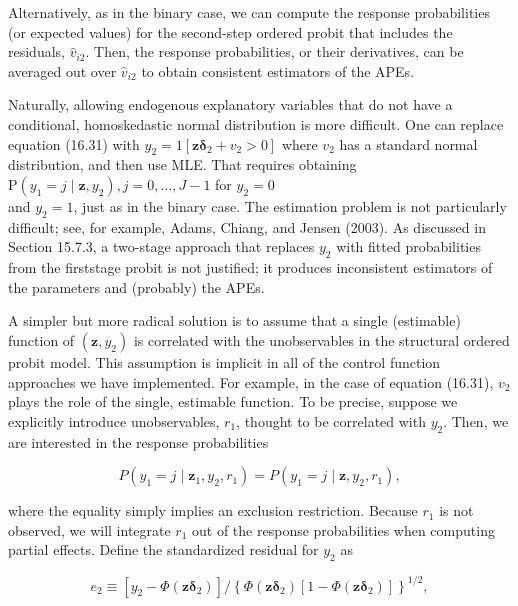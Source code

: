 \documentclass[10pt]{article}
\begin{document}
Alternatively, as in the binary case, we can compute the response probabilities (or expected values) for the second-step ordered probit that includes the residuals, $\hat{v}_{i 2}$. Then, the response probabilities, or their derivatives, can be averaged out over $\hat{v}_{i 2}$ to obtain consistent estimators of the APEs.

Naturally, allowing endogenous explanatory variables that do not have a conditional, homoskedastic normal distribution is more difficult. One can replace equation (16.31) with $y_{2}=1\left[\mathbf{z} \boldsymbol{\delta}_{2}+v_{2}>0\right]$ where $v_{2}$ has a standard normal distribution, and then use MLE. That requires obtaining $\mathrm{P}\left(y_{1}=j \mid \mathbf{z}, y_{2}\right), j=0, \ldots, J-1$ for $y_{2}=0$\\
and $y_{2}=1$, just as in the binary case. The estimation problem is not particularly difficult; see, for example, Adams, Chiang, and Jensen (2003). As discussed in Section 15.7.3, a two-stage approach that replaces $y_{2}$ with fitted probabilities from the firststage probit is not justified; it produces inconsistent estimators of the parameters and (probably) the APEs.

A simpler but more radical solution is to assume that a single (estimable) function of $\left(\mathbf{z}, y_{2}\right)$ is correlated with the unobservables in the structural ordered probit model. This assumption is implicit in all of the control function approaches we have implemented. For example, in the case of equation (16.31), $v_{2}$ plays the role of the single, estimable function. To be precise, suppose we explicitly introduce unobservables, $r_{1}$, thought to be correlated with $y_{2}$. Then, we are interested in the response probabilities


\begin{equation*}
P\left(y_{1}=j \mid \mathbf{z}_{1}, y_{2}, r_{1}\right)=P\left(y_{1}=j \mid \mathbf{z}, y_{2}, r_{1}\right), \tag{16.33}
\end{equation*}


where the equality simply implies an exclusion restriction. Because $r_{1}$ is not observed, we will integrate $r_{1}$ out of the response probabilities when computing partial effects. Define the standardized residual for $y_{2}$ as


\begin{equation*}
e_{2} \equiv\left[y_{2}-\Phi\left(\mathbf{z} \boldsymbol{\delta}_{2}\right)\right] /\left\{\Phi\left(\mathbf{z} \boldsymbol{\delta}_{2}\right)\left[1-\Phi\left(\mathbf{z} \boldsymbol{\delta}_{2}\right)\right]\right\}^{1 / 2}, \tag{16.34}
\end{equation*}
\end{document}
